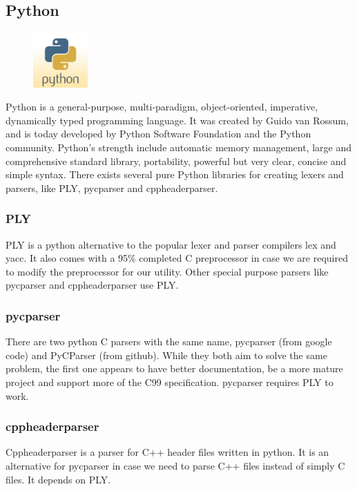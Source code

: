 \subsection{Python}
\begin{figure}
	\begin{center}
	\vspace{-30pt}
		\includegraphics[width=2.1cm]{./planning/img/python_logo}
	\vspace{-30pt}
	\end{center}
\end{figure}
Python is a general-purpose, multi-paradigm, object-oriented, imperative,
dynamically typed programming language. It was created by Guido van Rossum,
and is today developed by Python Software Foundation and the Python community.
Python’s strength include automatic memory management, large and comprehensive
standard library, portability, powerful but very clear, concise and simple
syntax. There exists several pure Python libraries for creating lexers and
parsers, like PLY, pycparser and cppheaderparser.

\subsubsection{PLY}
PLY is a python alternative to the popular lexer and parser compilers lex and
yacc. It also comes with a 95\% completed C preprocessor in case we are
required to modify the preprocessor for our utility. Other special purpose
parsers like pycparser and cppheaderparser use PLY.

\subsubsection{pycparser}
There are two python C parsers with the same name, pycparser (from google code)
and PyCParser (from github). While they both aim to solve the same problem, the
first one appears to have better documentation, be a more mature project and
support more of the C99 specification. pycparser requires PLY to work.

\subsubsection{cppheaderparser}
Cppheaderparser is a parser for C++ header files written in python. It is an
alternative for pycparser in case we need to parse C++ files instead of simply
C files. It depends on PLY.

